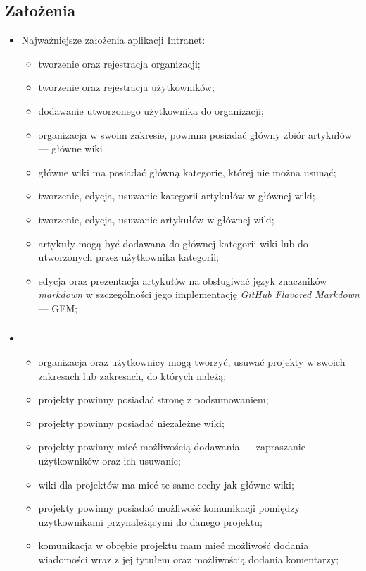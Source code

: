 \documentclass{beamer}
\newenvironment{justbe}%
{\setlength{\leftmargini}{0pt}\begin{itemize}\item[]}%
{\end{itemize}}
\begin{document}
\subsection{Założenia}
\begin{frame}
 \begin{justbe}
 Najważniejsze założenia aplikacji Intranet:
 \begin{itemize}
  \item tworzenie oraz rejestracja organizacji;
  \item tworzenie oraz rejestracja użytkowników;
  \item dodawanie utworzonego użytkownika do organizacji;
  \item organizacja w swoim zakresie, powinna posiadać główny zbiór artykułów --- główne wiki
  \item główne wiki ma posiadać główną kategorię, której nie można usunąć;
 \item tworzenie, edycja, usuwanie kategorii artykułów w głównej wiki;
 \item tworzenie, edycja, usuwanie artykułów w głównej wiki; 
 \item artykuły mogą być dodawana do głównej kategorii wiki lub do utworzonych przez użytkownika kategorii;
 \item edycja oraz prezentacja artykułów na obsługiwać język znaczników \emph{markdown} w szczególności jego implementację \textit{GitHub Flavored Markdown} --- GFM;
 \end{itemize}
\end{justbe}
\end{frame}

\begin{frame}
 \frametitle{}
 \begin{justbe}
    \begin{itemize}
    \item organizacja oraz użytkownicy mogą tworzyć, usuwać projekty w swoich zakresach lub zakresach, do których należą;
    \item projekty powinny posiadać stronę z podsumowaniem;
    \item projekty powinny posiadać niezależne wiki;
    \item projekty powinny mieć możliwością dodawania --- zapraszanie --- użytkowników oraz ich usuwanie;
    \item wiki dla projektów ma mieć te same cechy jak główne wiki;
    \item projekty powinny posiadać możliwość komunikacji pomiędzy użytkownikami przynależącymi do danego projektu;
    \item komunikacja w obrębie projektu mam mieć możliwość dodania wiadomości wraz z jej tytułem oraz możliwością dodania komentarzy;
    \end{itemize}
 \end{justbe}
\end{frame}
\end{document}
